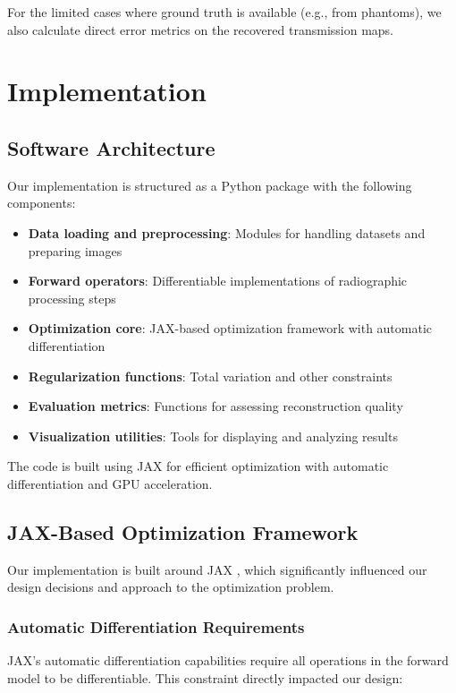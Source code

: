 \documentclass[nomenclature, english, bibtex]{kththesis}
\numberwithin{listing}{chapter}
\begin{document}
For the limited cases where ground truth is available (e.g., from phantoms), we also calculate direct error metrics on the recovered transmission maps.
\chapter{Implementation}

\section{Software Architecture}
Our implementation is structured as a Python package with the following components:
\begin{itemize}
    \item \textbf{Data loading and preprocessing}: Modules for handling datasets and preparing images
    \item \textbf{Forward operators}: Differentiable implementations of radiographic processing steps
    \item \textbf{Optimization core}: JAX-based optimization framework with automatic differentiation
    \item \textbf{Regularization functions}: Total variation and other constraints
    \item \textbf{Evaluation metrics}: Functions for assessing reconstruction quality
    \item \textbf{Visualization utilities}: Tools for displaying and analyzing results
\end{itemize}

The code is built using JAX for efficient optimization with automatic differentiation and GPU acceleration.

\section{JAX-Based Optimization Framework}
Our implementation is built around JAX \cite{jax2018github}, which significantly influenced our design decisions and approach to the optimization problem.

\subsection{Automatic Differentiation Requirements}
JAX's automatic differentiation capabilities require all operations in the forward model to be differentiable. This constraint directly impacted our design:
\end{document}
